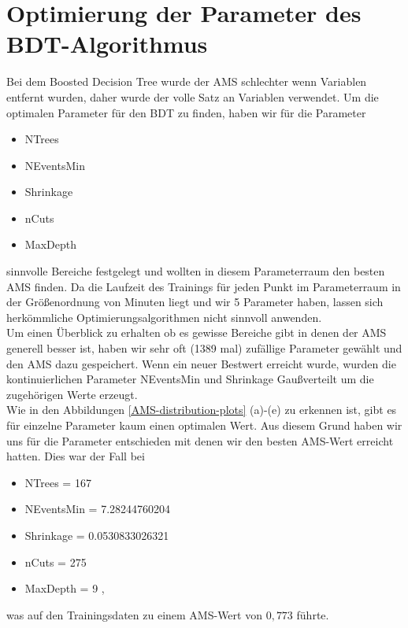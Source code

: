 \section{Optimierung der Parameter des BDT-Algorithmus}
Bei dem Boosted Decision Tree wurde der AMS schlechter wenn Variablen entfernt wurden, daher wurde der volle Satz an Variablen verwendet. Um die optimalen Parameter für den BDT zu finden, haben wir für die Parameter
\begin{itemize}
	\item NTrees
	\item NEventsMin
	\item Shrinkage
	\item nCuts
	\item MaxDepth
\end{itemize} 
sinnvolle Bereiche festgelegt und wollten in diesem Parameterraum den besten AMS finden. Da die Laufzeit des Trainings für jeden Punkt im Parameterraum in der Größenordnung von Minuten liegt und wir 5 Parameter haben, lassen sich herkömmliche Optimierungsalgorithmen nicht sinnvoll anwenden.\\
Um einen Überblick zu erhalten ob es gewisse Bereiche gibt in denen der AMS generell besser ist, haben wir sehr oft (1389 mal) zufällige Parameter gewählt und den AMS dazu gespeichert. Wenn ein neuer Bestwert erreicht wurde, wurden die kontinuierlichen Parameter NEventsMin und Shrinkage Gaußverteilt um die zugehörigen Werte erzeugt.\\
Wie in den Abbildungen \ref{AMS-distribution-plots} (a)-(e) zu erkennen ist, gibt es für einzelne Parameter kaum einen optimalen Wert. Aus diesem Grund haben wir uns für die Parameter entschieden mit denen wir den besten AMS-Wert erreicht hatten. Dies war der Fall bei
\begin{itemize}
	\item NTrees = 167
	\item NEventsMin = 7.28244760204
	\item Shrinkage = 0.0530833026321
	\item nCuts = 275
	\item MaxDepth  = 9  ,
\end{itemize} 
was auf den Trainingsdaten zu einem AMS-Wert von $0{,}773$ führte.

